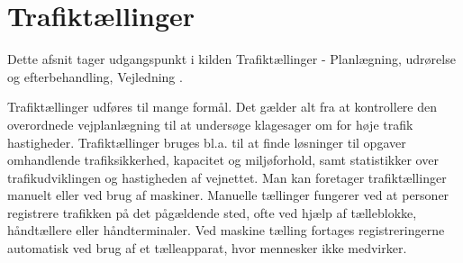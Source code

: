 \section{Trafiktællinger}
\label{sub:trafiktaellinger}
Dette afsnit tager udgangspunkt i kilden Trafiktællinger - Planlægning, udrørelse og efterbehandling, Vejledning \autocite{tallinger}.

Trafiktællinger udføres til mange formål. Det gælder alt fra at kontrollere den overordnede vejplanlægning til at undersøge klagesager om for høje trafik hastigheder. Trafiktællinger bruges bl.a. til at finde løsninger til opgaver omhandlende trafiksikkerhed, kapacitet og miljøforhold, samt statistikker over trafikudviklingen og hastigheden af vejnettet. Man kan foretager trafiktællinger manuelt eller ved brug af maskiner.
Manuelle tællinger fungerer ved at personer registrere trafikken på det pågældende sted, ofte ved hjælp af tælleblokke, håndtællere eller håndterminaler. Ved maskine tælling fortages registreringerne automatisk ved brug af et tælleapparat, hvor mennesker ikke medvirker.

